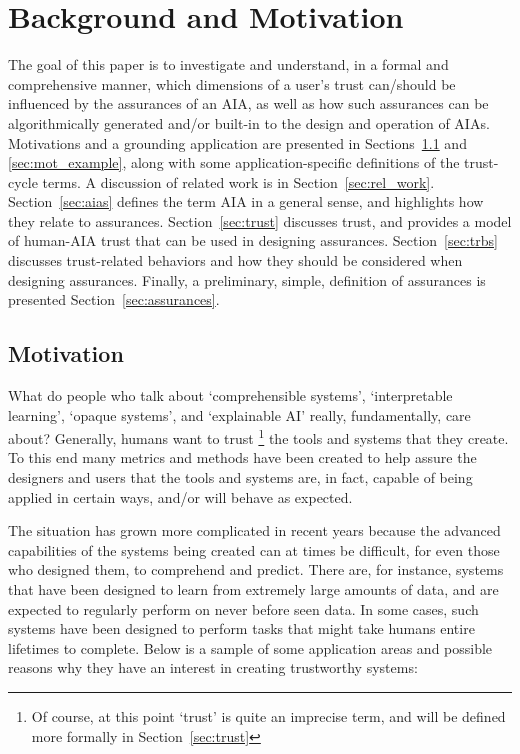 \section{Background and Motivation} \label{sec:background}
The goal of this paper is to investigate and understand, in a formal and comprehensive manner, which dimensions of a user's trust can/should be influenced by the assurances of an AIA, as well as how such assurances can be algorithmically generated and/or built-in to the design and operation of AIAs. Motivations and a grounding application are presented in Sections~\ref{sec:motivation} and \ref{sec:mot_example}, along with some application-specific definitions of the trust-cycle terms. A discussion of related work is in Section~\ref{sec:rel_work}. Section~\ref{sec:aias} defines the term AIA in a general sense, and highlights how they relate to assurances. Section~\ref{sec:trust} discusses trust, and provides a model of human-AIA trust that can be used in designing assurances. Section~\ref{sec:trbs} discusses trust-related behaviors and how they should be considered when designing assurances. Finally, a preliminary, simple, definition of assurances is presented Section~\ref{sec:assurances}. 

\subsection{Motivation} \label{sec:motivation}
    What do people who talk about `comprehensible systems', `interpretable learning', `opaque systems', and `explainable AI' really, fundamentally, care about? Generally, humans want to trust \footnote{Of course, at this point `trust' is quite an imprecise term, and will be defined more formally in Section~\ref{sec:trust}} the tools and systems that they create. To this end many metrics and methods have been created to help assure the designers and users that the tools and systems are, in fact, capable of being applied in certain ways, and/or will behave as expected. 

    The situation has grown more complicated in recent years because the advanced capabilities of the systems being created can at times be difficult, for even those who designed them, to comprehend and predict. There are, for instance, systems that have been designed to learn from extremely large amounts of data, and are expected to regularly perform on never before seen data. In some cases, such systems have been designed to perform tasks that might take humans entire lifetimes to complete. Below is a sample of some application areas and possible reasons why they have an interest in creating trustworthy systems:

